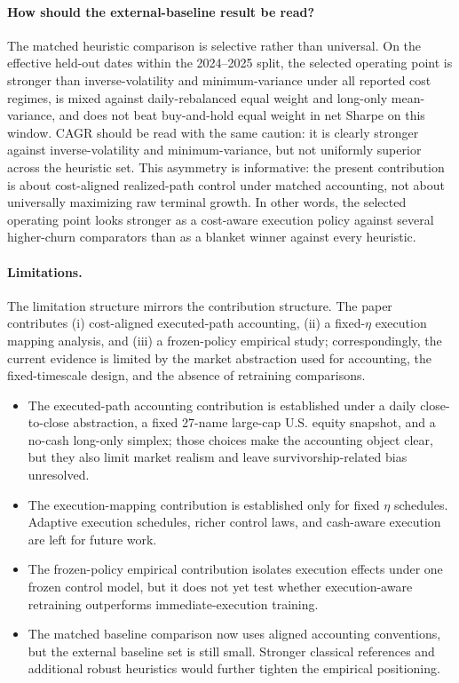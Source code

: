 \documentclass[10pt,twocolumn]{article}
\begin{document}
\paragraph{How should the external-baseline result be read?}
The matched heuristic comparison is selective rather than universal. On the effective held-out dates within the 2024--2025 split, the selected operating point is stronger than inverse-volatility and minimum-variance under all reported cost regimes, is mixed against daily-rebalanced equal weight and long-only mean-variance, and does not beat buy-and-hold equal weight in net Sharpe on this window. CAGR should be read with the same caution: it is clearly stronger against inverse-volatility and minimum-variance, but not uniformly superior across the heuristic set. This asymmetry is informative: the present contribution is about cost-aligned realized-path control under matched accounting, not about universally maximizing raw terminal growth. In other words, the selected operating point looks stronger as a cost-aware execution policy against several higher-churn comparators than as a blanket winner against every heuristic.

\paragraph{Limitations.}
The limitation structure mirrors the contribution structure. The paper contributes (i) cost-aligned executed-path accounting, (ii) a fixed-$\eta$ execution mapping analysis, and (iii) a frozen-policy empirical study; correspondingly, the current evidence is limited by the market abstraction used for accounting, the fixed-timescale design, and the absence of retraining comparisons.
\begin{itemize}[leftmargin=*,itemsep=1pt]
\item The executed-path accounting contribution is established under a daily close-to-close abstraction, a fixed 27-name large-cap U.S. equity snapshot, and a no-cash long-only simplex; those choices make the accounting object clear, but they also limit market realism and leave survivorship-related bias unresolved.
\item The execution-mapping contribution is established only for fixed $\eta$ schedules. Adaptive execution schedules, richer control laws, and cash-aware execution are left for future work.
\item The frozen-policy empirical contribution isolates execution effects under one frozen control model, but it does not yet test whether execution-aware retraining outperforms immediate-execution training.
\item The matched baseline comparison now uses aligned accounting conventions, but the external baseline set is still small. Stronger classical references and additional robust heuristics would further tighten the empirical positioning.
\end{itemize}
\end{document}
